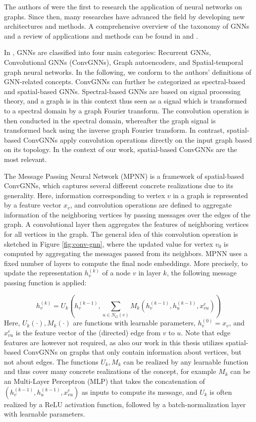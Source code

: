 \documentclass[draft,final]{vutinfth} %
\begin{document}
The authors of \cite{Sperduti1997} were the first to research the application of neural networks on graphs. Since then, many researches have advanced the field by developing new architectures and methods. 
A comprehensive overview of the taxonomy of GNNs and a review of applications and methods can be found in \cite{Wu2019} and \cite{Zhou2020}. 

In \cite{Wu2019}, GNNs are classified into four main categories: Recurrent GNNs, Convolutional GNNs (ConvGNNs), Graph autoencoders, and Spatial-temporal graph neural networks. In the following, we conform to the authors' definitions of GNN-related concepts. 
ConvGNNs can further be categorized as spectral-based and spatial-based GNNs. Spectral-based GNNs are based on signal processing theory, and a graph is in this context thus seen as a signal which is transformed to a spectral domain by a graph Fourier transform. The convolution operation is then conducted in the spectral domain, whereafter the graph signal is transformed back using the inverse graph Fourier transform. 
In contrast, spatial-based ConvGNNs apply convolution operations directly on the input graph based on its topology. 
In the context of our work, spatial-based ConvGNNs are the most relevant. 

The Message Passing Neural Network (MPNN) \cite{GilmerSRVD17} is a framework of spatial-based ConvGNNs, which captures several different concrete realizations due to its generality. 
Here, information corresponding to vertex $v$ in a graph is represented by a feature vector $x_v$, and convolution operations are defined to aggregate information of the neighboring vertices by passing messages over the edges of the graph. A convolutional layer then aggregates the features of neighboring vertices for all vertices in the graph. The general idea of this convolution operation is sketched in Figure \ref{fig:conv-gnn}, 
where the updated value for vertex $v_0$ is computed by aggregating the messages passed from its neighbors. MPNN uses a fixed number of layers to compute the final node embeddings. 
More precisely, to update the representation $h_v^{(k)}$ of a node $v$ in layer $k$, the following message passing function is applied: 

\[
    h_v^{(k)} = U_k (h_v^{(k-1)}, \sum_{u \in N_G(v)} M_k(h_v^{(k-1)}, h_u^{(k-1)}, x_{vu}^{e}))
\]
Here, $U_k(\cdot), M_k(\cdot)$ are functions with learnable parameters, $h_v^{(0)} = x_v$, and $x_{vu}^{e}$ is the feature vector of the (directed) edge from $v$ to $u$. Note that edge features are however not required, as also our work in this thesis utilizes spatial-based ConvGNNs on graphs that only contain information about vertices, but not about edges. 
The functions $U_k, M_k$ can be realized by any learnable function and thus cover many concrete realizations of the concept, for example $M_k$ can be an Multi-Layer Perceptron (MLP) that takes the concatenation of $(h_v^{(k-1)}, h_u^{(k-1)}, x_{vu}^{e})$ as inputs to compute its message, and $U_k$ is often realized by a ReLU activation function, followed by a batch-normalization \cite{IoffeS15} layer with learnable parameters. 
\end{document}

